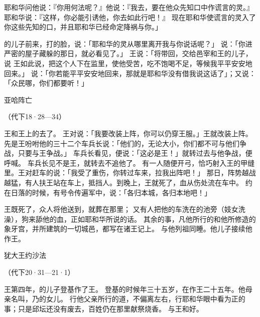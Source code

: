 {耶和华问他说：『你用何法呢？』他说：『我去，要在他众先知口中作谎言的灵。』耶和华说：『这样，你必能引诱他，你去如此行吧！』
现在耶和华使谎言的灵入了你这些先知的口，并且耶和华已经命定降祸与你。」
\par }{\PP {}的儿子{}前来，打{}的脸，说：「耶和华的灵从哪里离开我与你说话呢？」
说：「你进严密的屋子藏躲的那日，就必看见了。」
王说：「将{}带回，交给邑宰{}和王的儿子{}，说
王如此说，把这个人下在监里，使他受苦，吃不饱喝不足，等候我平平安安地回来。」
说：「你若能平平安安地回来，那就是耶和华没有借我说这话了」；又说：「众民哪，你们都要听！」
\par }{\SH 亚哈阵亡
\par }{\R （代下18·28—34）
\par }{\PP {}王和{}王{}上{}的{}去了。
王对{}说：「我要改装上阵，你可以仍穿王服。」{}王就改装上阵。
先是{}王吩咐他的三十二个车兵长说：「他们的{}，无论大小，你们都不可与他们争战，只要与{}王争战。」
车兵长看见{}，便说：「这必是{}王！」就转过去与他争战，{}便呼喊。
车兵长见不是{}王，就转去不追他了。
有一人随便开弓，恰巧射入{}王的甲缝里。王对赶车的说：「我受了重伤，你转过车来，拉我出阵吧！」
那日，阵势越战越猛，有人扶王站在车上，抵挡{}人。到晚上，王就死了，血从伤处流在车中。
约在日落的时候，有号令传遍军中，说：「各归本城，各归本地吧！」
\par }{\PP {}王既死了，众人将他送到{}，就葬在那里；
又有人把他的车洗在{}的池旁（妓女{}洗澡），狗来舔他的血，正如耶和华所说的话。
其余的事，凡他所行的和他所修造的象牙宫，并所建筑的一切城邑，都写在{}诸王记上。
与他列祖同睡。他儿子{}接续他作王。
\par }{\SH 犹大王约沙法
\par }{\R （代下20·31—21·1）
\par }{\PP {}王{}第四年，{}的儿子{}登基作了{}王。
登基的时候年三十五岁，在{}作王二十五年。他母亲名叫{}，乃{}的女儿。
行他父亲{}所行的道，不偏离左右，行耶和华眼中看为正的事；只是邱坛还没有废去，百姓仍在那里献祭烧香。
与{}王和好。
}
